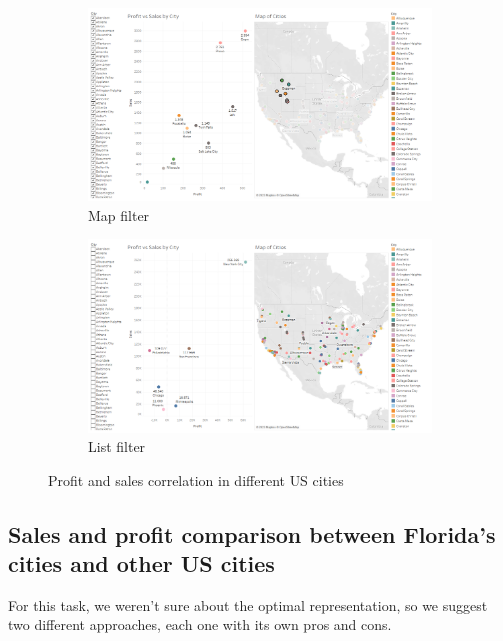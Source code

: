 \documentclass[openany]{article}
\begin{document}
\begin{figure}[h]\ContinuedFloat
\centering
	\begin{subfigure}{\textwidth}
		\centering
		\includegraphics[width=\linewidth]{Tableau/c_2}
		\caption{Map filter}
		\label {map_filter}
	\end{subfigure}

	\begin{subfigure}{\textwidth}
		\centering
		\includegraphics[width=\linewidth]{Tableau/c_3}
		\caption{List filter}
		\label {list_filter}
	\end{subfigure}
	\caption{Profit and sales correlation in different US cities}
\end{figure}

\clearpage 

\subsection {Sales and profit comparison between Florida's cities and other US cities}

For this task, we weren't sure about the optimal representation, so we suggest two different approaches, each one with its own pros and cons.
\end{document}
